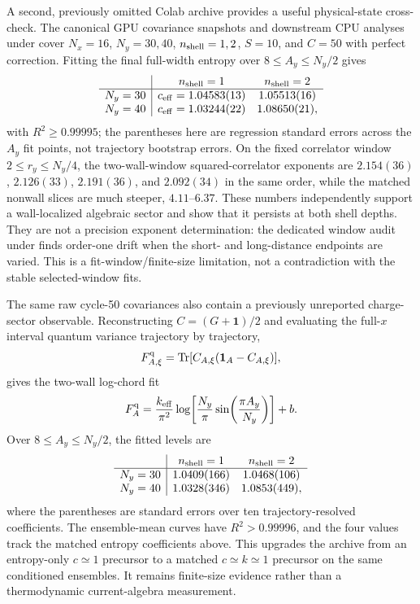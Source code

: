 \documentclass[aps,prx,twocolumn,floatfix,nofootinbib,superscriptaddress,longbibliography]{revtex4-2}
\newcommand{\qTr}{\operatorname{Tr}}
\begin{document}
A second, previously omitted Colab archive provides a useful physical-state cross-check.
The canonical GPU covariance snapshots and downstream CPU analyses under
 cover $N_x=16$, $N_y=30,40$,
$n_{\rm shell}=1,2$, $S=10$, and $C=50$ with perfect correction.  Fitting the final
full-width entropy over $8\leq A_y\leq N_y/2$ gives
\begin{equation}
\begin{array}{c|cc}
 & n_{\rm shell}=1 & n_{\rm shell}=2\\ \hline
N_y=30 & c_{\rm eff}=1.04583(13) & 1.05513(16)\\
N_y=40 & c_{\rm eff}=1.03244(22) & 1.08650(21),
\end{array}
\end{equation}
with $R^2\geq0.99995$; the parentheses here are regression standard errors across the
$A_y$ fit points, not trajectory bootstrap errors.  On the fixed correlator window
$2\leq r_y\leq N_y/4$, the two-wall-window squared-correlator exponents are
$2.154(36)$, $2.126(33)$, $2.191(36)$, and $2.092(34)$ in the same order, while the
matched nonwall slices are much steeper, $4.11$--$6.37$.  These numbers independently
support a wall-localized algebraic sector and show that it persists at both shell depths.
They are not a precision exponent determination: the dedicated window audit under
finds order-one drift when the short- and long-distance endpoints are varied.  This is a
fit-window/finite-size limitation, not a contradiction with the stable selected-window
fits.

The same raw cycle-50 covariances also contain a previously unreported charge-sector
observable.  Reconstructing $C=(G+\mathbf{1})/2$ and evaluating the full-$x$ interval
quantum variance trajectory by trajectory,
\begin{equation}
 F_{A,\xi}^{\rm q}=\qTr[C_{A,\xi}(\mathbf{1}_A-C_{A,\xi})],
\end{equation}
gives the two-wall log-chord fit
\begin{equation}
 F_A^{\rm q}=\frac{k_{\rm eff}}{\pi^2}
 \log\!\left[\frac{N_y}{\pi}\sin\!\left(\frac{\pi A_y}{N_y}\right)\right]+b.
\end{equation}
Over $8\leq A_y\leq N_y/2$, the fitted levels are
\begin{equation}
\begin{array}{c|cc}
 & n_{\rm shell}=1 & n_{\rm shell}=2\\ \hline
N_y=30 & 1.0409(166) & 1.0468(106)\\
N_y=40 & 1.0328(346) & 1.0853(449),
\end{array}
\end{equation}
where the parentheses are standard errors over ten trajectory-resolved coefficients.
The ensemble-mean curves have $R^2>0.99996$, and the four values track the matched entropy
coefficients above.  This upgrades the archive from an entropy-only $c\simeq1$ precursor
to a matched $c\simeq k\simeq1$ precursor on the same conditioned ensembles.  It remains
finite-size evidence rather than a thermodynamic current-algebra measurement.
\end{document}
